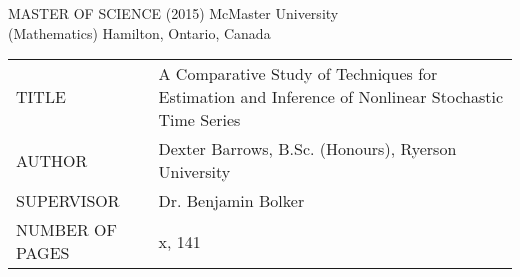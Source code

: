 \newpage
\thispagestyle{empty}
\centering
\null


MASTER OF SCIENCE (2015) 	\hfill 	McMaster University \\
(Mathematics)				\hfill	Hamilton, Ontario, Canada \\

\vspace{3cm}

\begin{tabular}{p{5cm}p{10cm}}
	TITLE 			& A Comparative Study of Techniques for Estimation and Inference of Nonlinear Stochastic Time Series \\
	AUTHOR 			& Dexter Barrows, B.Sc. (Honours), Ryerson University \\
	SUPERVISOR 		& Dr. Benjamin Bolker \\
	NUMBER OF PAGES & x, 141 \\
\end{tabular}